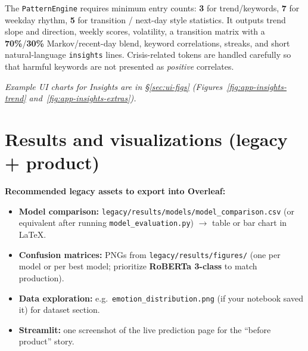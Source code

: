 \documentclass[11pt,a4paper]{article}
\begin{document}
The \texttt{PatternEngine} requires minimum entry counts: \textbf{3} for trend/keywords, \textbf{7} for weekday rhythm, \textbf{5} for transition / next-day style statistics. It outputs trend slope and direction, weekly scores, volatility, a transition matrix with a \textbf{70\%}/\textbf{30\%} Markov/recent-day blend, keyword correlations, streaks, and short natural-language \texttt{insights} lines. Crisis-related tokens are handled carefully so that harmful keywords are not presented as \emph{positive} correlates.

\noindent\textit{Example UI charts for Insights are in \S\ref{sec:ui-figs} (Figures~\ref{fig:app-insights-trend} and~\ref{fig:app-insights-extras}).}

\section{Results and visualizations (legacy + product)}
\label{sec:results-figs}

\noindent
\textbf{Recommended legacy assets to export into Overleaf:}
\begin{itemize}[itemsep=0.3em,label=\color{MMnavy}$\bullet$]
  \item \textbf{Model comparison:} \texttt{legacy/results/models/model\_comparison.csv} (or equivalent after running \texttt{model\_evaluation.py}) $\rightarrow$ table or bar chart in \LaTeX.
  \item \textbf{Confusion matrices:} PNGs from \texttt{legacy/results/figures/} (one per model or per best model; prioritize \textbf{RoBERTa 3-class} to match production).
  \item \textbf{Data exploration:} e.g.\ \texttt{emotion\_distribution.png} (if your notebook saved it) for dataset section.
  \item \textbf{Streamlit:} one screenshot of the live prediction page for the ``before product'' story.
\end{itemize}
\end{document}
